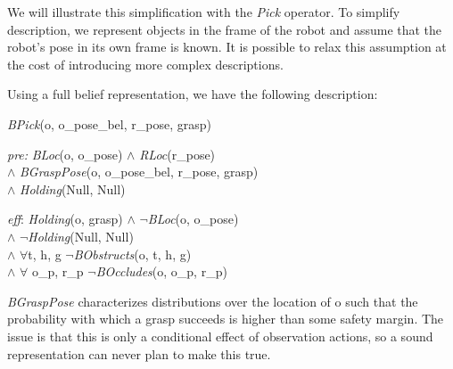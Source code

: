 We will illustrate this simplification with the \emph{Pick}
operator. To simplify description, we represent objects in the frame
of the robot and assume that the robot's pose in its own frame is
known. It is possible to relax this assumption at the cost of
introducing more complex descriptions.

Using a full belief representation, we have the following
description:
\begin{tightlist}
\item[]\emph{BPick}(o, o\_pose\_bel, r\_pose, grasp)
\item[\emph{pre:}] \emph{BLoc}(o, o\_pose) $\wedge$
  \emph{RLoc}(r\_pose) \\$\wedge$ \emph{BGraspPose}(o, o\_pose\_bel,
  r\_pose, grasp) \\$\wedge$ \emph{Holding}(Null, Null)
\item[\emph{eff}:] \emph{Holding}(o, grasp) $\wedge$
  $\lnot$\emph{BLoc}(o, o\_pose) \\$\wedge$
  $\lnot$\emph{Holding}(Null, Null) \\$\wedge$ $\forall$t, h, g
  $\lnot$\emph{BObstructs}(o, t, h, g)\\$\wedge$ $\forall$ o\_p,
  r\_p $\lnot$\emph{BOccludes}(o, o\_p, r\_p)
\end{tightlist}
\emph{BGraspPose} characterizes distributions over the location of o
such that the probability with which a grasp succeeds is higher than
some safety margin. The issue is that this is only a conditional
effect of observation actions, so a sound representation can never
plan to make this true.  

